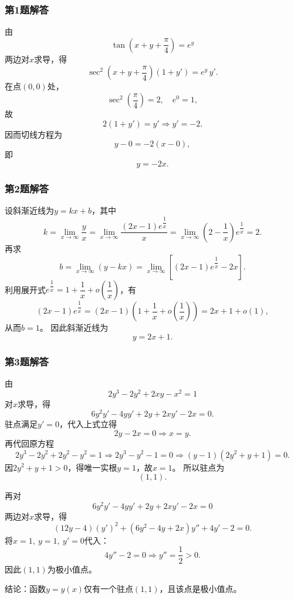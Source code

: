 \documentclass[./book.tex]{subfiles}
\begin{document}
    \subsubsection*{第1题解答}
    \begin{analysisbox}
        由
        \[
            \tan\!\left(x+y+\frac{\pi}{4}\right)=e^y
        \]
        两边对$x$求导，得
        \[
            \sec^2\!\left(x+y+\frac{\pi}{4}\right)(1+y')=e^y\,y'.
        \]
        在点$(0,0)$处，
        \[
            \sec^2\!\left(\frac{\pi}{4}\right)=2,\quad e^0=1,
        \]
        故
        \[
            2(1+y')=y' \Longrightarrow y'=-2.
        \]
        因而切线方程为
        \[
            y-0=-2(x-0),
        \]
        即
        \[
            \boxed{y=-2x}.
        \]
    \end{analysisbox}

    \subsubsection*{第2题解答}
    \begin{analysisbox}
        设斜渐近线为$y=kx+b$，其中
        \[
            k=\lim_{x\to\infty}\frac{y}{x}
            =\lim_{x\to\infty}\frac{(2x-1)e^{\dfrac{1}{x}}}{x}
            =\lim_{x\to\infty}\left(2-\frac{1}{x}\right)e^{\dfrac{1}{x}}=2.
        \]
        再求
        \[
            b=\lim_{x\to\infty}(y-kx)
            =\lim_{x\to\infty}\left[(2x-1)e^{\dfrac{1}{x}}-2x\right].
        \]
        利用展开式$e^{\dfrac{1}{x}}=1+\dfrac{1}{x}+o\!\left(\dfrac{1}{x}\right)$，有
        \[
            (2x-1)e^{\dfrac{1}{x}}
            =(2x-1)\left(1+\frac{1}{x}+o\!\left(\frac{1}{x}\right)\right)
            =2x+1+o(1),
        \]
        从而$b=1$。
        因此斜渐近线为
        \[
            \boxed{y=2x+1}.
        \]
    \end{analysisbox}

    \subsubsection*{第3题解答}
    \begin{analysisbox}
        由
        \[
            2y^3-2y^2+2xy-x^2=1
        \]
        对$x$求导，得
        \[
            6y^2y'-4yy'+2y+2xy'-2x=0.
        \]
        驻点满足$y'=0$，代入上式立得
        \[
            2y-2x=0 \Longrightarrow x=y.
        \]
        再代回原方程
        \[
            2y^3-2y^2+2y^2-y^2=1
            \Longrightarrow 2y^3-y^2-1=0
            \Longrightarrow (y-1)(2y^2+y+1)=0.
        \]
        因$2y^2+y+1>0$，得唯一实根$y=1$，故$x=1$。
        所以驻点为
        \[
            \boxed{(1,1)}.
        \]

        再对
        \[
            6y^2y'-4yy'+2y+2xy'-2x=0
        \]
        两边对$x$求导，得
        \[
            (12y-4)(y')^2+(6y^2-4y+2x)y''+4y'-2=0.
        \]
        将$x=1,\ y=1,\ y'=0$代入：
        \[
            4y''-2=0 \Longrightarrow y''=\frac12>0.
        \]
        因此$(1,1)$为极小值点。

        \medskip
        结论：函数$y=y(x)$仅有一个驻点$\boxed{(1,1)}$，且该点是$\boxed{\text{极小值点}}$。
    \end{analysisbox}
\end{document}
